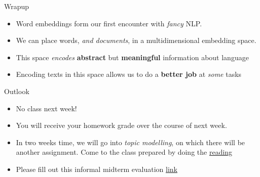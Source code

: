 \documentclass[
  10pt,
  ignorenonframetext,
  aspectratio=169]{beamer}
\newif\ifbibliography
\begin{document}
\begin{frame}{Wrapup}
\protect\hypertarget{wrapup}{}
\begin{itemize}
  \item<1->Word embeddings form our first encounter with \textit{fancy} NLP.
  \item<2->We can place words, \textit{and documents}, in a multidimensional embedding space.
  \item<3->This space \textit{encodes} \textbf{abstract} but \textbf{meaningful} information about language
  \item<4->Encoding texts in this space allows us to do a \textbf{better job} at \textit{some} tasks
\end{itemize}
\end{frame}

\begin{frame}{Outlook}
\protect\hypertarget{outlook}{}
\begin{itemize}
  \item<1->No class next week!
  \item<2->You will receive your homework grade over the course of next week.
  \item<3->In two weeks time, we will go into \textit{topic modelling}, on which there will be another assignment. Come to the class prepared by doing the  \href{http://www.cs.columbia.edu/~blei/papers/Blei2012.pdf}{reading}
  \item<4->Please fill out this informal midterm evaluation \href{https://docs.google.com/forms/d/e/1FAIpQLSf3W4erny4OmLh8cFIocRIL0epzCn9D0NF66gAboNU3aI1uhg/viewform?usp=sf_link}{link}
\end{itemize}
\end{frame}

\begin{frame}[allowframebreaks]{}
  \bibliographytrue
  
\end{frame}
\end{document}
